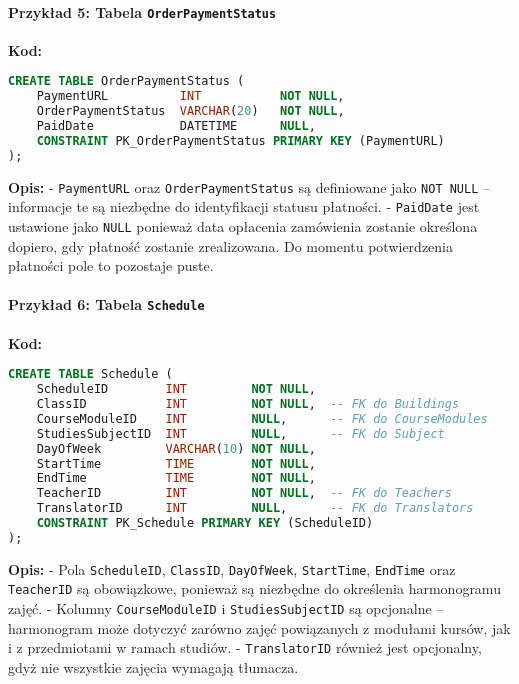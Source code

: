 \documentclass[12pt]{article}
\begin{document}
\paragraph{Przykład 5: Tabela \texttt{OrderPaymentStatus}}  
\textbf{Kod:}
\begin{lstlisting}[language=SQL]
CREATE TABLE OrderPaymentStatus (
    PaymentURL          INT           NOT NULL,
    OrderPaymentStatus  VARCHAR(20)   NOT NULL,
    PaidDate            DATETIME      NULL,
    CONSTRAINT PK_OrderPaymentStatus PRIMARY KEY (PaymentURL)
);
\end{lstlisting}
\textbf{Opis:}  
- \texttt{PaymentURL} oraz \texttt{OrderPaymentStatus} są definiowane jako \texttt{NOT NULL} – informacje te są niezbędne do identyfikacji statusu płatności.
- \texttt{PaidDate} jest ustawione jako \texttt{NULL} ponieważ data opłacenia zamówienia zostanie określona dopiero, gdy płatność zostanie zrealizowana. Do momentu potwierdzenia płatności pole to pozostaje puste.

\paragraph{Przykład 6: Tabela \texttt{Schedule}}  
\textbf{Kod:}
\begin{lstlisting}[language=SQL]
CREATE TABLE Schedule (
    ScheduleID        INT         NOT NULL,
    ClassID           INT         NOT NULL,  -- FK do Buildings
    CourseModuleID    INT         NULL,      -- FK do CourseModules
    StudiesSubjectID  INT         NULL,      -- FK do Subject
    DayOfWeek         VARCHAR(10) NOT NULL,
    StartTime         TIME        NOT NULL,
    EndTime           TIME        NOT NULL,
    TeacherID         INT         NOT NULL,  -- FK do Teachers
    TranslatorID      INT         NULL,      -- FK do Translators
    CONSTRAINT PK_Schedule PRIMARY KEY (ScheduleID)
);
\end{lstlisting}
\textbf{Opis:}  
- Pola \texttt{ScheduleID}, \texttt{ClassID}, \texttt{DayOfWeek}, \texttt{StartTime}, \texttt{EndTime} oraz \texttt{TeacherID} są obowiązkowe, ponieważ są niezbędne do określenia harmonogramu zajęć.
- Kolumny \texttt{CourseModuleID} i \texttt{StudiesSubjectID} są opcjonalne – harmonogram może dotyczyć zarówno zajęć powiązanych z modułami kursów, jak i z przedmiotami w ramach studiów.  
- \texttt{TranslatorID} również jest opcjonalny, gdyż nie wszystkie zajęcia wymagają tłumacza.
\end{document}
